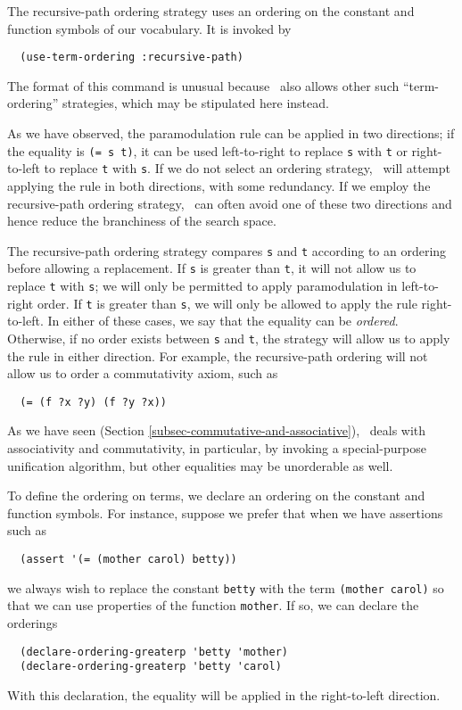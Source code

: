 The recursive-path ordering strategy uses an ordering on the constant
and function symbols of our vocabulary.   It is invoked by
\begin{verbatim}
  (use-term-ordering :recursive-path)
\end{verbatim}
The format of this command is unusual because \snark\  also allows other such
``term-ordering'' strategies, which may be stipulated here instead.

As we have observed, the paramodulation rule can be applied in two
directions; if the equality is \verb'(= s t)', it can be used
left-to-right to replace {\tt s} with {\tt t} or right-to-left to
replace {\tt t} with {\tt s}.  If we do not select an ordering
strategy, \snark\  will attempt applying the rule in both directions,
with some redundancy.  If we employ the recursive-path ordering
strategy, \snark\  can often avoid one of these two directions and
hence reduce the branchiness of the search space.

The recursive-path ordering strategy compares {\tt s} and {\tt t}
according to an ordering before allowing a replacement.  If {\tt s} is
greater than {\tt t}, it will not allow us to replace {\tt t} with
{\tt s}; we will only be permitted to apply paramodulation in
left-to-right order.  If {\tt t} is greater than {\tt s}, we will only
be allowed to apply the rule right-to-left.  In either of these cases,
we say that the equality can be {\em ordered}.  Otherwise, if no order
exists between {\tt s} and {\tt t}, the strategy will allow us to
apply the rule in either direction.  For example, the recursive-path
ordering will not allow us to order a commutativity axiom, such as
\begin{verbatim}
  (= (f ?x ?y) (f ?y ?x))
\end{verbatim}

As we have seen (Section \ref{subsec-commutative-and-associative}),
\Snark\  deals with associativity and commutativity, in particular, by
invoking a special-purpose unification algorithm, but other equalities
may be unorderable as well.

To define the ordering on terms, we declare an ordering on the
constant and function symbols.  For instance, suppose we prefer that
when we have assertions such as
\begin{verbatim}
  (assert '(= (mother carol) betty))
\end{verbatim}
we always wish to replace the constant \verb'betty' with the term
 \verb'(mother carol)' so that we can use properties of the
 function \verb'mother'.  If so, we can declare the orderings
\begin{verbatim}
  (declare-ordering-greaterp 'betty 'mother)
  (declare-ordering-greaterp 'betty 'carol)
\end{verbatim}
With this declaration, the equality will be applied in the
right-to-left direction.

